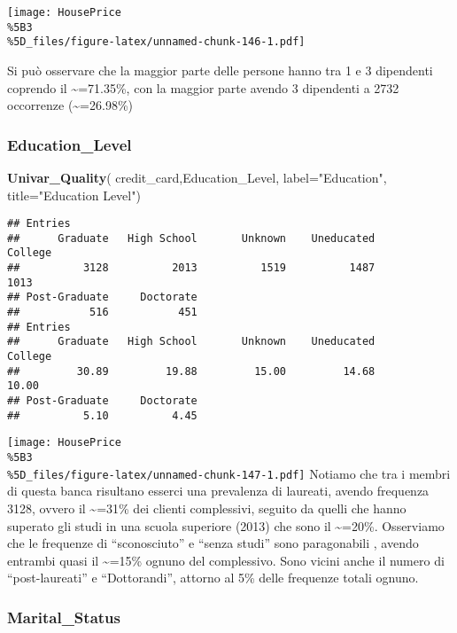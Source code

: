 \documentclass[
]{article}
\newenvironment{Shaded}{\begin{snugshade}}{\end{snugshade}}
\newcommand{\AttributeTok}[1]{\textcolor[rgb]{0.13,0.29,0.53}{#1}}
\newcommand{\FunctionTok}[1]{\textcolor[rgb]{0.13,0.29,0.53}{\textbf{#1}}}
\newcommand{\NormalTok}[1]{#1}
\newcommand{\StringTok}[1]{\textcolor[rgb]{0.31,0.60,0.02}{#1}}
\begin{document}
\texttt{[image: HousePrice\\\%5B3\\\%5D\_files/figure-latex/unnamed-chunk-146-1.pdf]}

Si può osservare che la maggior parte delle persone hanno tra 1 e 3
dipendenti coprendo il \textasciitilde=71.35\%, con la maggior parte
avendo 3 dipendenti a 2732 occorrenze (\textasciitilde=26.98\%)

\subsubsection{Education\_Level}\label{education_level}

\begin{Shaded}
\begin{Highlighting}[]
\FunctionTok{Univar\_Quality}\NormalTok{(}
\NormalTok{  credit\_card,Education\_Level,}
  \AttributeTok{label=}\StringTok{"Education"}\NormalTok{,}
  \AttributeTok{title=}\StringTok{"Education Level"}\NormalTok{)}
\end{Highlighting}
\end{Shaded}

\begin{verbatim}
## Entries
##      Graduate   High School       Unknown    Uneducated       College 
##          3128          2013          1519          1487          1013 
## Post-Graduate     Doctorate 
##           516           451 
## Entries
##      Graduate   High School       Unknown    Uneducated       College 
##         30.89         19.88         15.00         14.68         10.00 
## Post-Graduate     Doctorate 
##          5.10          4.45
\end{verbatim}

\texttt{[image: HousePrice\\\%5B3\\\%5D\_files/figure-latex/unnamed-chunk-147-1.pdf]}
Notiamo che tra i membri di questa banca risultano esserci una
prevalenza di laureati, avendo frequenza 3128, ovvero il
\textasciitilde=31\% dei clienti complessivi, seguito da quelli che
hanno superato gli studi in una scuola superiore (2013) che sono il
\textasciitilde=20\%. Osserviamo che le frequenze di ``sconosciuto'' e
``senza studi'' sono paragonabili , avendo entrambi quasi il
\textasciitilde=15\% ognuno del complessivo. Sono vicini anche il numero
di ``post-laureati'' e ``Dottorandi'', attorno al 5\% delle frequenze
totali ognuno.

\subsubsection{Marital\_Status}\label{marital_status}
\end{document}

